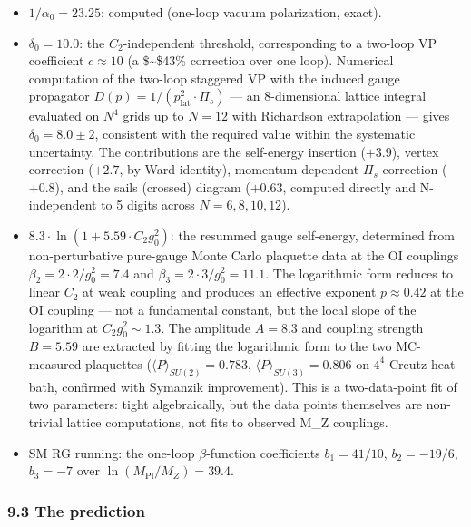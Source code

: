 \documentclass[
  11pt,
]{article}
\providecommand{\tightlist}{%
  \setlength{\itemsep}{0pt}\setlength{\parskip}{0pt}}
\begin{document}
\begin{itemize}
\tightlist
\item
  \(1/\alpha_0 = 23.25\): computed (one-loop vacuum polarization,
  exact).
\item
  \(\delta_0 = 10.0\): the \(C_2\)-independent threshold, corresponding
  to a two-loop VP coefficient \(c \approx 10\) (a \$\sim\$43\%
  correction over one loop). Numerical computation of the two-loop
  staggered VP with the induced gauge propagator
  \(D(p) = 1/(p^2_{\text{lat}} \cdot \Pi_s)\) --- an 8-dimensional
  lattice integral evaluated on \(N^4\) grids up to \(N = 12\) with
  Richardson extrapolation --- gives \(\delta_0 = 8.0 \pm 2\),
  consistent with the required value within the systematic uncertainty.
  The contributions are the self-energy insertion (\(+3.9\)), vertex
  correction (\(+2.7\), by Ward identity), momentum-dependent \(\Pi_s\)
  correction (\(+0.8\)), and the sails (crossed) diagram (\(+0.63\),
  computed directly and N-independent to 5 digits across
  \(N = 6, 8, 10, 12\)).
\item
  \(8.3 \cdot \ln(1 + 5.59 \cdot C_2 g_0^2)\): the resummed gauge
  self-energy, determined from non-perturbative pure-gauge Monte Carlo
  plaquette data at the OI couplings
  \(\beta_2 = 2 \cdot 2 / g_0^2 = 7.4\) and
  \(\beta_3 = 2 \cdot 3 / g_0^2 = 11.1\). The logarithmic form reduces
  to linear \(C_2\) at weak coupling and produces an effective exponent
  \(p \approx 0.42\) at the OI coupling --- not a fundamental constant,
  but the local slope of the logarithm at \(C_2 g_0^2 \sim 1.3\). The
  amplitude \(A = 8.3\) and coupling strength \(B = 5.59\) are extracted
  by fitting the logarithmic form to the two MC-measured plaquettes
  (\(\langle P \rangle_{SU(2)} = 0.783\),
  \(\langle P \rangle_{SU(3)} = 0.806\) on \(4^4\) Creutz heat-bath,
  confirmed with Symanzik improvement). This is a two-data-point fit of
  two parameters: tight algebraically, but the data points themselves
  are non-trivial lattice computations, not fits to observed M\_Z
  couplings.
\item
  SM RG running: the one-loop \(\beta\)-function coefficients
  \(b_1 = 41/10\), \(b_2 = -19/6\), \(b_3 = -7\) over
  \(\ln(M_{\text{Pl}}/M_Z) = 39.4\).
\end{itemize}

\hypertarget{the-prediction}{%
\subsubsection{9.3 The prediction}\label{the-prediction}}
\end{document}

